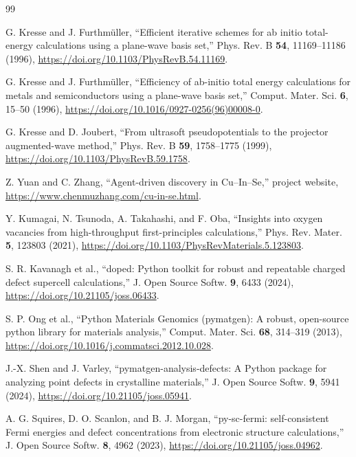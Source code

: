 \documentclass[aip,jap,reprint,amsmath,amssymb]{revtex4-2}
\begin{document}
\begin{thebibliography}{99}

G. Kresse and J. Furthm\"uller,
``Efficient iterative schemes for ab initio total-energy calculations using a plane-wave basis set,''
Phys. Rev. B \textbf{54}, 11169--11186 (1996),
\url{https://doi.org/10.1103/PhysRevB.54.11169}.

G. Kresse and J. Furthm\"uller,
``Efficiency of ab-initio total energy calculations for metals and semiconductors using a plane-wave basis set,''
Comput. Mater. Sci. \textbf{6}, 15--50 (1996),
\url{https://doi.org/10.1016/0927-0256(96)00008-0}.

G. Kresse and D. Joubert,
``From ultrasoft pseudopotentials to the projector augmented-wave method,''
Phys. Rev. B \textbf{59}, 1758--1775 (1999),
\url{https://doi.org/10.1103/PhysRevB.59.1758}.

Z. Yuan and C. Zhang,
``Agent-driven discovery in Cu--In--Se,''
project website, \url{https://www.chenmuzhang.com/cu-in-se.html}.

Y. Kumagai, N. Tsunoda, A. Takahashi, and F. Oba,
``Insights into oxygen vacancies from high-throughput first-principles calculations,''
Phys. Rev. Mater. \textbf{5}, 123803 (2021),
\url{https://doi.org/10.1103/PhysRevMaterials.5.123803}.

S. R. Kavanagh et al.,
``doped: Python toolkit for robust and repeatable charged defect supercell calculations,''
J. Open Source Softw. \textbf{9}, 6433 (2024),
\url{https://doi.org/10.21105/joss.06433}.

S. P. Ong et al.,
``Python Materials Genomics (pymatgen): A robust, open-source python library for materials analysis,''
Comput. Mater. Sci. \textbf{68}, 314--319 (2013),
\url{https://doi.org/10.1016/j.commatsci.2012.10.028}.

J.-X. Shen and J. Varley,
``pymatgen-analysis-defects: A Python package for analyzing point defects in crystalline materials,''
J. Open Source Softw. \textbf{9}, 5941 (2024),
\url{https://doi.org/10.21105/joss.05941}.

A. G. Squires, D. O. Scanlon, and B. J. Morgan,
``py-sc-fermi: self-consistent Fermi energies and defect concentrations from electronic structure calculations,''
J. Open Source Softw. \textbf{8}, 4962 (2023),
\url{https://doi.org/10.21105/joss.04962}.


\end{thebibliography}
\end{document}

